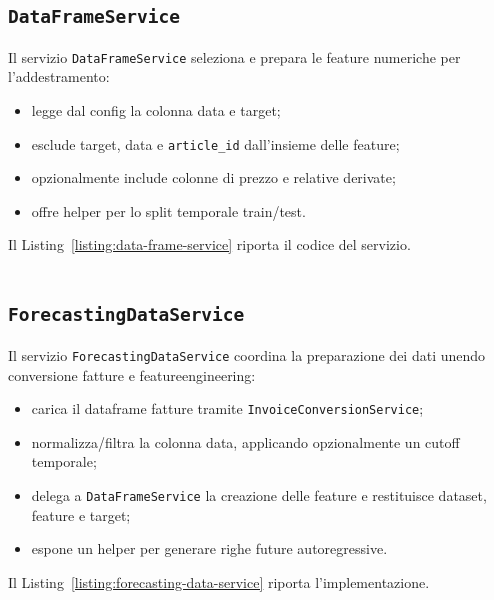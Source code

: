 \subsection{\texttt{DataFrameService}}
\label{sec:code-data-frame-service}
Il servizio \texttt{DataFrameService} seleziona e prepara le feature numeriche per l’addestramento:
\begin{itemize}
    \item legge dal config la colonna data e target;
    \item esclude target, data e \texttt{article\_id} dall’insieme delle feature;
    \item opzionalmente include colonne di prezzo e relative derivate;
    \item offre helper per lo split temporale train/test.
\end{itemize}
Il Listing~\ref{listing:data-frame-service} riporta il codice del servizio.
\captionsetup{type=listing, belowskip=0pt}
\inputminted[fontsize=\small, breaklines, breakanywhere=true, linenos=true, bgcolor=gray!10]{python}{code/services/data_frame_service.py}
\label{listing:data-frame-service}

\subsection{\texttt{ForecastingDataService}}
\label{sec:code-forecasting-data-service}
Il servizio \texttt{ForecastingDataService} coordina la preparazione dei dati unendo conversione fatture e \gls{featureengineering}:
\begin{itemize}
    \item carica il dataframe fatture tramite \texttt{InvoiceConversionService};
    \item normalizza/filtra la colonna data, applicando opzionalmente un cutoff temporale;
    \item delega a \texttt{DataFrameService} la creazione delle feature e restituisce dataset, feature e target;
    \item espone un helper per generare righe future autoregressive.
\end{itemize}
Il Listing~\ref{listing:forecasting-data-service} riporta l’implementazione.
\captionsetup{type=listing, belowskip=0pt}
\inputminted[fontsize=\small, breaklines, breakanywhere=true, linenos=true, bgcolor=gray!10]{python}{code/services/forecasting_data_service.py}
\label{listing:forecasting-data-service}

